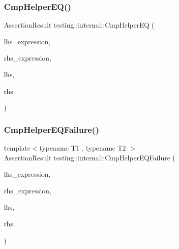 \subsubsection{\texorpdfstring{CmpHelperEQ()}{CmpHelperEQ()}\hspace{0.1cm}{\footnotesize\ttfamily [2/2]}}
{\footnotesize\ttfamily Assertion\+Result testing\+::internal\+::\+Cmp\+Helper\+EQ (\begin{DoxyParamCaption}\item[{const char $\ast$}]{lhs\+\_\+expression,  }\item[{const char $\ast$}]{rhs\+\_\+expression,  }\item[{\mbox{\hyperlink{namespacetesting_1_1internal_a05c6bd9ede5ccdf25191a590d610dcc6}{Biggest\+Int}}}]{lhs,  }\item[{\mbox{\hyperlink{namespacetesting_1_1internal_a05c6bd9ede5ccdf25191a590d610dcc6}{Biggest\+Int}}}]{rhs }\end{DoxyParamCaption})}

\mbox{\label{namespacetesting_1_1internal_a1def8ec9393360a1b34a20528703e7f7}} 
\subsubsection{\texorpdfstring{CmpHelperEQFailure()}{CmpHelperEQFailure()}}
{\footnotesize\ttfamily template$<$typename T1 , typename T2 $>$ \\
Assertion\+Result testing\+::internal\+::\+Cmp\+Helper\+E\+Q\+Failure (\begin{DoxyParamCaption}\item[{const char $\ast$}]{lhs\+\_\+expression,  }\item[{const char $\ast$}]{rhs\+\_\+expression,  }\item[{const T1 \&}]{lhs,  }\item[{const T2 \&}]{rhs }\end{DoxyParamCaption})}

\mbox{\label{namespacetesting_1_1internal_a98ce463e5dbe0c6120fa817e1f8f2944}} 
